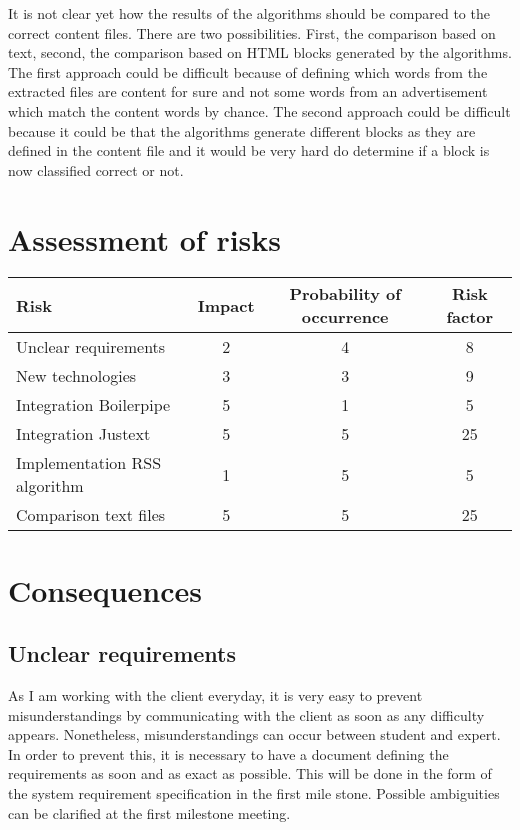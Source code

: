 It is not clear yet how the results of the algorithms should be compared to the correct content files. There are two possibilities. First, the comparison based on text, second, the comparison based on HTML blocks generated by the algorithms. 
The first approach could be difficult because of defining which words from the extracted files are content for sure and not some words from an advertisement which match the content words by chance.
The second approach could be difficult because it could be that the algorithms generate different blocks as they are defined in the content file and it would be very hard do determine if a block is now classified correct or not.

\section{Assessment of risks}

\begin{table}[h]
\begin{tabular}{|l|c|c|c|}
\hline
\textbf{Risk} & \textbf{Impact} & \textbf{Probability of occurrence} & \textbf{Risk factor} \\ \hline
Unclear requirements & 2 & 4 & 8\\ \hline
New technologies & 3 & 3 & 9 \\ \hline
Integration Boilerpipe & 5 & 1 & 5\\ \hline
Integration Justext & 5 & 5 & 25 \\ \hline
Implementation RSS algorithm & 1 & 5 & 5\\ \hline
Comparison text files & 5 & 5 & 25 \\ \hline
\end{tabular}
\end{table}

\section{Consequences}



\subsection{Unclear requirements}

As I am working with the client everyday, it is very easy to prevent misunderstandings by communicating with the client as soon as any difficulty appears. Nonetheless, misunderstandings can occur between student and expert. In order to prevent this, it is necessary to have a document defining the requirements as soon and as exact as possible. This will be done in the form of the system requirement specification in the first mile stone. Possible ambiguities can be clarified at the first milestone meeting.

